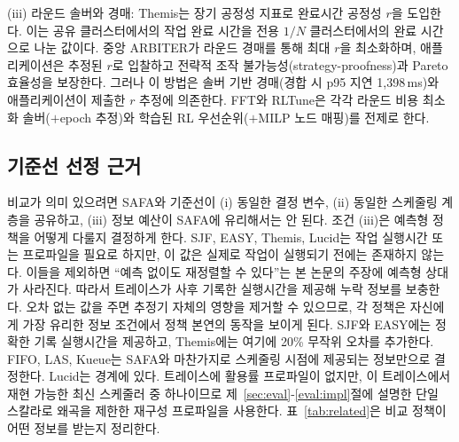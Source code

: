 \documentclass{ieeetj}
\begin{document}
(iii) 라운드 솔버와 경매: Themis\cite{mahajan2020themis}는 장기 공정성 지표로 완료시간 공정성 $r$을 도입한다. 이는 공유 클러스터에서의 작업 완료 시간을 전용 $1/N$ 클러스터에서의 완료 시간으로 나눈 값이다. 중앙 ARBITER가 라운드 경매를 통해 최대 $r$을 최소화하며, 애플리케이션은 추정된 $r$로 입찰하고 전략적 조작 불가능성(strategy-proofness)과 Pareto 효율성을 보장한다. 그러나 이 방법은 솔버 기반 경매(경합 시 p95 지연 1,398\,ms)와 애플리케이션이 제출한 $r$ 추정에 의존한다. FFT\cite{fft2025}와 RLTune\cite{rltune2025}은 각각 라운드 비용 최소화 솔버($+$epoch 추정)와 학습된 RL 우선순위($+$MILP 노드 매핑)를 전제로 한다.

\subsection{기준선 선정 근거}\label{baseline-rationale}
비교가 의미 있으려면 SAFA와 기준선이 (i) 동일한 결정 변수, (ii) 동일한 스케줄링 계층을 공유하고, (iii) 정보 예산이 SAFA에 유리해서는 안 된다. 조건 (iii)은 예측형 정책을 어떻게 다룰지 결정하게 한다. SJF, EASY, Themis, Lucid는 작업 실행시간 또는 프로파일을 필요로 하지만, 이 값은 실제로 작업이 실행되기 전에는 존재하지 않는다. 이들을 제외하면 ``예측 없이도 재정렬할 수 있다''는 본 논문의 주장에 예측형 상대가 사라진다. 따라서 트레이스가 사후 기록한 실행시간을 제공해 누락 정보를 보충한다. 오차 없는 값을 주면 추정기 자체의 영향을 제거할 수 있으므로, 각 정책은 자신에게 가장 유리한 정보 조건에서 정책 본연의 동작을 보이게 된다. SJF와 EASY에는 정확한 기록 실행시간을 제공하고, Themis에는 여기에 20\% 무작위 오차를 추가한다. FIFO, LAS, Kueue는 SAFA와 마찬가지로 스케줄링 시점에 제공되는 정보만으로 결정한다. Lucid는 경계에 있다. 트레이스에 활용률 프로파일이 없지만, 이 트레이스에서 재현 가능한 최신 스케줄러 중 하나이므로 제~\ref{sec:eval}-\ref{eval:impl}절에 설명한 단일 스칼라로 왜곡을 제한한 재구성 프로파일을 사용한다. 표~\ref{tab:related}은 비교 정책이 어떤 정보를 받는지 정리한다.
\end{document}
